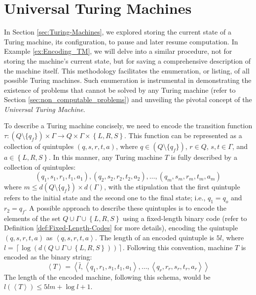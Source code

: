 %
%

\section{Universal Turing Machines}
\label{sec:Universal-Turing-Machines}

In Section \ref{sec:Turing-Machines}, we explored storing the current state of a Turing machine, its configuration, to pause and later resume computation. In Example \ref{ex:Encoding_TM}, we will delve into a similar procedure, not for storing the machine's current state, but for saving a comprehensive description of the machine itself. This methodology facilitates the enumeration, or listing, of all possible Turing machines. Such enumeration is instrumental in demonstrating the existence of problems that cannot be solved by any Turing machine (refer to Section \ref{sec:non_computable_problems}) and unveiling the pivotal concept of the \emph{Universal Turing Machine}.

\begin{example}
\label{ex:Encoding_TM}
To describe a Turing machine concisely, we need to encode the transition function $\tau:\left(Q\setminus \{q_{f}\}\right)\times\Gamma\rightarrow Q\times\Gamma\times\left\{ L,R,S\right\}$. This function can be represented as a collection of quintuples $\left(q,s,r,t,a\right)$, where $q \in \left(Q\setminus \{q_{f}\}\right)$, $r \in Q$, $s, t\in\Gamma$, and $a\in\left\{ L,R,S\right\}$. In this manner, any Turing machine $T$ is fully described by a collection of quintuples:
\[
\left(q_{1},s_{1},r_{1},t_{1},a_{1}\right),\left(q_{2},s_{2},r_{2},t_{2},a_{2}\right),\ldots,\left(q_{m},s_
{m},r_{m},t_{m},a_{m}\right)
\]
where $m \leq d\left(Q\setminus \{q_{f}\}\right) \times d(\Gamma)$, with the stipulation that the first quintuple refers to the initial state and the second one to the final state; i.e., $q_{1} = q_{o}$ and $r_{2} = q_{f}$. A possible approach to describe these quintuples is to encode the elements of the set $Q\cup\Gamma\cup\left\{ L, R, S \right\}$ using a fixed-length binary code (refer to Definition \ref{def:Fixed-Length-Codes} for more details), encoding the quintuple $\left(q,s,r,t,a\right)$ as $\left\langle q, s, r, t, a \right\rangle$. The length of an encoded quintuple is $5l$, where $l=\left\lceil \log\left(d\left(Q\cup\Gamma\cup\left\{ L,R,S\right\}\right)\right)\right\rceil$. Following this convention, machine $T$ is encoded as the binary string:
\[
\left\langle T \right\rangle = \left\langle \bar{l}, \left\langle q_{1}, r_{1}, s_{1}, t_{1}, a_{1} \right\rangle, \ldots, \left\langle q_{r}, r_{r}, s_{r}, t_{r}, a_{r} \right\rangle \right\rangle 
\]
The length of the encoded machine, following this schema, would be $l(\left\langle T \right\rangle) \leq 5lm + \log l + 1$.
\end{example}

